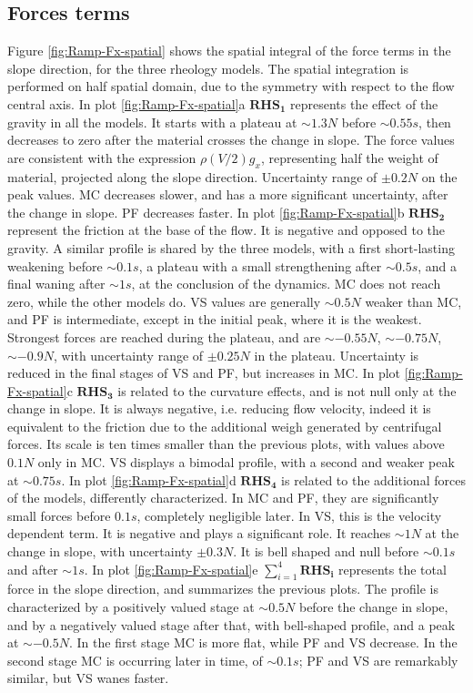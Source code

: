 \documentclass{article}
\begin{document}
\subsection{Forces terms}
Figure \ref{fig:Ramp-Fx-spatial} shows the spatial integral of the force terms in the slope direction, for the three rheology models. The spatial integration is performed on half spatial domain, due to the symmetry with respect to the flow central axis. In plot \ref{fig:Ramp-Fx-spatial}a $\boldsymbol{RHS_1}$ represents the effect of the gravity in all the models. It starts with a plateau at $\sim 1.3 N$ before $\sim 0.55 s$, then decreases to zero after the material crosses the change in slope. The force values are consistent with the expression $\rho \left(V/2\right) g_x$, representing half the weight of material, projected along the slope direction. Uncertainty range of $\pm 0.2 N$ on the peak values. MC decreases slower, and has a more significant uncertainty, after the change in slope. PF decreases faster. In plot \ref{fig:Ramp-Fx-spatial}b $\boldsymbol{RHS_2}$ represent the friction at the base of the flow. It is negative and opposed to the gravity. A similar profile is shared by the three models, with a first short-lasting weakening before $\sim 0.1 s$, a plateau with a small strengthening after $\sim 0.5 s$, and a final waning after $\sim 1 s$, at the conclusion of the dynamics. MC does not reach zero, while the other models do. VS values are generally $\sim 0.5 N$ weaker than MC, and PF is intermediate, except in the initial peak, where it is the weakest. Strongest forces are reached during the plateau, and are $\sim -0.55 N$, $\sim -0.75 N$, $\sim -0.9 N$, with uncertainty range of $\pm 0.25 N$ in the plateau. Uncertainty is reduced in the final stages of VS and PF, but increases in MC. In plot \ref{fig:Ramp-Fx-spatial}c $\boldsymbol{RHS_3}$ is related to the curvature effects, and is not null only at the change in slope. It is always negative, i.e. reducing flow velocity, indeed it is equivalent to the friction due to the additional weigh generated by centrifugal forces. Its scale is ten times smaller than the previous plots, with values above $0.1 N$ only in MC. VS displays a bimodal profile, with a second and weaker peak at $\sim 0.75 s$. In plot \ref{fig:Ramp-Fx-spatial}d $\boldsymbol{RHS_4}$ is related to the additional forces of the models, differently characterized. In MC and PF, they are significantly small forces before $0.1 s$, completely negligible later. In VS, this is the velocity dependent term. It is negative and plays a significant role. It reaches $\sim 1 N$ at the change in slope, with uncertainty $\pm 0.3 N$. It is bell shaped and null before $\sim 0.1 s$ and after $\sim 1 s$. In plot \ref{fig:Ramp-Fx-spatial}e $\sum^4_{i=1}\boldsymbol{RHS_i}$ represents the total force in the slope direction, and summarizes the previous plots. The profile is characterized by a positively valued stage at $\sim 0.5 N$ before the change in slope, and by a negatively valued stage after that, with bell-shaped profile, and a peak at $\sim -0.5 N$. In the first stage MC is more flat, while PF and VS decrease. In the second stage MC is occurring later in time, of $\sim 0.1 s$; PF and VS are remarkably similar, but VS wanes faster.
\end{document}
